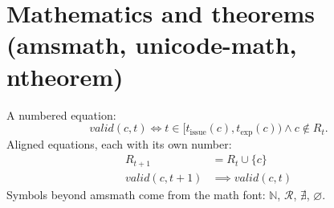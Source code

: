 \section{Mathematics and theorems (amsmath, unicode-math, ntheorem)}\label{guide:latex:theorems}
A numbered equation:
\begin{equation}\label{guide:eq:latex:window}
  \mathit{valid}(c, t) \iff t \in [t_\mathrm{issue}(c), t_\mathrm{exp}(c)) \land c \notin R_t .
\end{equation}
Aligned equations, each with its own number:
\begin{align}
  R_{t+1} &= R_t \cup \{ c \} \label{guide:eq:latex:fresh}\\
  \mathit{valid}(c, t+1) &\implies \mathit{valid}(c, t) \label{guide:eq:latex:valid}
\end{align}
Symbols beyond amsmath come from the math font: $\mathbb{N}$, $\mathcal{R}$, $\nexists$, $\varnothing$.

